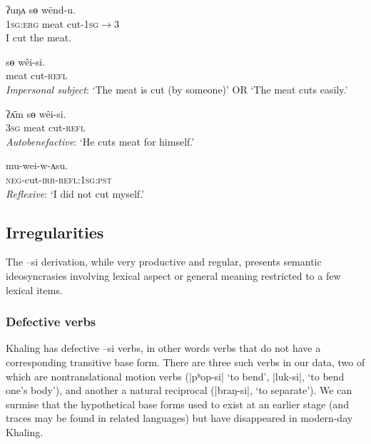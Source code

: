 \documentclass[twoside,a4paper,11pt]{article}
\newcommand{\ipa}[1]{{\phon#1}}
\begin{document}
\begin{exe}
\ex \label{ex:wendu} 
\gll 
\ipa{ʔuŋʌ}  	\ipa{sɵ}  	\ipa{wēnd-u.}  \\
\textsc{1sg:erg} meat cut-\textsc{1sg$\rightarrow$3} \\
\glt I cut the meat.
\end{exe}

\begin{exe}
\ex \label{ex:weisi} 
\gll 
 \ipa{sɵ}  	\ipa{wêi-si.}  \\
 meat cut-\textsc{refl} \\
\glt \textit{Impersonal subject}: `The meat is cut (by someone)' OR `The meat cuts easily.'
\end{exe}


\begin{exe}
\ex \label{ex:weisi2} 
\gll 
 \ipa{ʔʌ̄m} \ipa{sɵ}  	\ipa{wêi-si.}  \\
\textsc{3sg} meat cut-\textsc{refl} \\
\glt \textit{Autobenefactive}: `He cuts meat for himself.'
\end{exe}
 
\begin{exe}
\ex \label{ex:weiwasu} 
\gll 
	\ipa{mu-wei-w-ʌsu.}  \\
\textsc{neg}-cut-\textsc{irr}-\textsc{refl:1sg:pst} \\
\glt \textit{Reflexive}: `I did not cut myself.'
\end{exe}  

 \subsection{Irregularities}
The  \ipa{--si} derivation, while very productive and regular, presents semantic ideosyncrasies involving lexical aspect or general meaning restricted to a few lexical items.
  
\subsubsection{Defective verbs}
Khaling has defective \ipa{--si} verbs, in other words verbs that do not have a corresponding transitive base form. There are three such verbs in our data, two of which are nontranslational motion verbs  (|\ipa{pʰop-si}| `to bend', |\ipa{luk-si}|, `to bend one’s body’), and another a natural reciprocal (|\ipa{braŋ-si}|, `to separate’). We can surmise that the hypothetical base forms used to exist at an earlier stage (and traces may be found in related languages) but have disappeared in modern-day Khaling.
\end{document}
